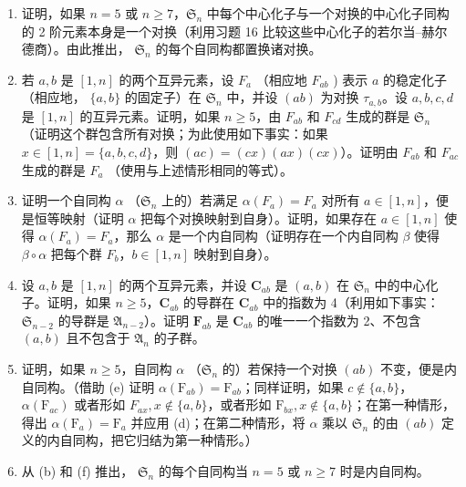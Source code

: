 \begin{enumerate}
\def\labelenumi{(\alph{enumi})}
\setcounter{enumi}{1}
\item
  证明，如果 \(n = 5\) 或 \(n \geqslant 7\)，\(\mathfrak{S}_n\) 中每个中心化子与一个对换的中心化子同构的 2 阶元素本身是一个对换（利用习题 16 比较这些中心化子的若尔当–赫尔德商）。由此推出， \(\mathfrak{S}_n\) 的每个自同构都置换诸对换。
\item
  若 \(a, b\) 是 \([1, n]\) 的两个互异元素，设 \(F_a\) （相应地 \(F_{ab}\) ) 表示 \(a\) 的稳定化子（相应地， \(\{a, b\}\) 的固定子）在 \(\mathfrak{S}_n\) 中，并设 \((ab)\) 为对换 \(\tau_{a,b}\)。设 \(a, b, c, d\) 是 \([1, n]\) 的互异元素。证明，如果 \(n \geqslant 5\)，由 \(F_{ab}\) 和 \(F_{cd}\) 生成的群是 \(\mathfrak{S}_n\) （证明这个群包含所有对换；为此使用如下事实：如果 \(x \in [1, n] = \{a, b, c, d\}\)，则 \((ac) = (cx)(ax)(cx)\)）。证明由 \(F_{ab}\) 和 \(F_{ac}\) 生成的群是 \(F_a\) （使用与上述情形相同的等式）。
\item
  证明一个自同构 \(\alpha\) （\(\mathfrak{S}_n\) 上的）若满足 \(\alpha(F_a) = F_a\) 对所有 \(a \in [1, n]\)，便是恒等映射（证明 \(\alpha\) 把每个对换映射到自身）。证明，如果存在 \(a \in [1, n]\) 使得 \(\alpha(F_a) = F_a\)，那么 \(\alpha\) 是一个内自同构（证明存在一个内自同构 \(\beta\) 使得 \(\beta \circ \alpha\) 把每个群 \(F_b\)，\(b \in [1, n]\) 映射到自身）。
\item
  设 \(a, b\) 是 \([1, n]\) 的两个互异元素，并设 \(\mathbf{C}_{ab}\) 是 \((a, b)\) 在 \(\mathfrak{S}_n\) 中的中心化子。证明，如果 \(n \geqslant 5\)，\(\mathbf{C}_{ab}\) 的导群在 \(\mathbf{C}_{ab}\) 中的指数为 4（利用如下事实： \(\mathfrak{S}_{n-2}\) 的导群是 \(\mathfrak{A}_{n-2}\)）。证明 \(\mathbf{F}_{ab}\) 是 \(\mathbf{C}_{ab}\) 的唯一一个指数为 2、不包含 \((a, b)\) 且不包含于 \(\mathfrak{A}_n\) 的子群。
\item
  证明，如果 \(n \geqslant 5\)，自同构 \(\alpha\) （\(\mathfrak{S}_n\) 的）若保持一个对换 \((ab)\) 不变，便是内自同构。（借助 (e) 证明 \(\alpha(\mathrm{F}_{ab}) = \mathrm{F}_{ab}\)；同样证明，如果 \(c \notin \{a, b\}\)，\(\alpha(\mathrm{F}_{ac})\) 或者形如 \(F_{ax}, x \notin \{a, b\}\)，或者形如 \(\mathrm{F}_{bx}, x \notin \{a, b\}\)；在第一种情形，得出 \(\alpha(\mathrm{F}_a) = \mathrm{F}_a\) 并应用 (d)；在第二种情形，将 \(\alpha\) 乘以 \(\mathfrak{S}_n\) 的由 \((ab)\) 定义的内自同构，把它归结为第一种情形。）
\item
  从 (b) 和 (f) 推出， \(\mathfrak{S}_n\) 的每个自同构当 \(n = 5\) 或 \(n \geqslant 7\) 时是内自同构。
\end{enumerate}

